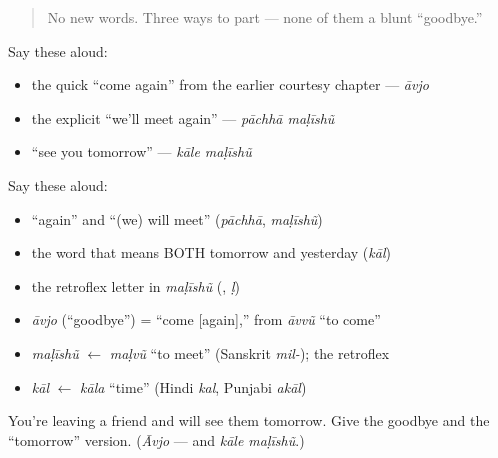 \label{lesson:GU-C04-practice}



\begin{quote}
No new words. Three ways to part — none of them a blunt \textquotedblleft{}goodbye.\textquotedblright{}
\end{quote}

\begin{culture}
Say these aloud:

\begin{itemize}
\raggedright
  \item the quick \textquotedblleft{}come again\textquotedblright{} from the earlier courtesy chapter — \emph{āvjo}
  \item the explicit \textquotedblleft{}we'll meet again\textquotedblright{} — \emph{pāchhā maḷīshũ}
  \item \textquotedblleft{}see you tomorrow\textquotedblright{} — \emph{kāle maḷīshũ}
\end{itemize}
\end{culture}

\begin{cousinweb}
Say these aloud:

\begin{itemize}
\raggedright
  \item \textquotedblleft{}again\textquotedblright{} and \textquotedblleft{}(we) will meet\textquotedblright{} (\emph{pāchhā}, \emph{maḷīshũ})
  \item the word that means BOTH tomorrow and yesterday (\emph{kāl})
  \item the retroflex letter in \emph{maḷīshũ} (, \emph{ḷ})
\end{itemize}
\end{cousinweb}

\begin{grammarlens}[title={What you've built — roots you now carry}]
\begin{itemize}
\raggedright
  \item \emph{āvjo} (\textquotedblleft{}goodbye\textquotedblright{}) = \textquotedblleft{}come {[}again{]},\textquotedblright{} from \emph{āvvũ} \textquotedblleft{}to come\textquotedblright{}
  \item \emph{maḷīshũ} $\leftarrow$ \emph{maḷvũ} \textquotedblleft{}to meet\textquotedblright{} (Sanskrit \emph{mil-}); the retroflex 
  \item \emph{kāl} $\leftarrow$ \emph{kāla} \textquotedblleft{}time\textquotedblright{} (Hindi \emph{kal}, Punjabi \emph{akāl})
\end{itemize}
\end{grammarlens}

\begin{tcolorbox}[breakable,colback=teal!4,colframe=teal!35!black,title={Before you move on}]
You're leaving a friend and will see them tomorrow. Give the goodbye and the \textquotedblleft{}tomorrow\textquotedblright{} version. (\emph{Āvjo} — and \emph{kāle maḷīshũ}.)
\end{tcolorbox}
